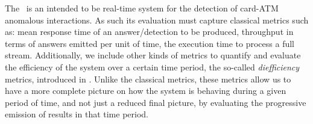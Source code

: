 The \DPATM\ is an intended to be real-time system for the detection of card-ATM anomalous interactions. As such its evaluation must capture classical metrics such as: mean response time of an answer/detection to be produced, throughput in terms of answers emitted per unit of time, the execution time to process a full stream. 
Additionally, we include other kinds of metrics to quantify and evaluate the efficiency of the system over a certain time period, the so-called \emph{diefficiency} metrics, introduced in \cite{exps-diefficiency}. Unlike the classical metrics, these metrics allow us to have a more complete picture on how the system is behaving during a given period of time, and not just a reduced final picture, by evaluating the progressive emission of results in that time period.

